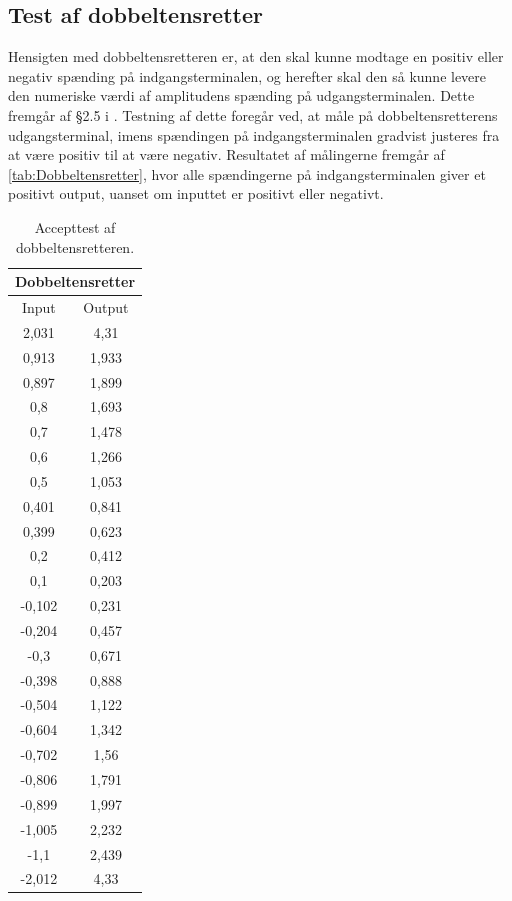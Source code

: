 \subsection{Test af dobbeltensretter}
Hensigten med dobbeltensretteren er, at den skal kunne modtage en positiv eller negativ spænding på indgangsterminalen, og herefter skal den så kunne levere den numeriske værdi af amplitudens spænding på udgangsterminalen. Dette fremgår af §2.5 i . Testning af dette foregår ved, at måle på dobbeltensretterens udgangsterminal, imens spændingen på indgangsterminalen gradvist justeres fra at være positiv til at være negativ. Resultatet af målingerne fremgår af \autoref{tab:Dobbeltensretter}, hvor alle spændingerne på indgangsterminalen giver et positivt output, uanset om inputtet er positivt eller negativt.
%
\begin{table}[H]
\centering
\begin{tabular}{|c|c|}
\hline
\multicolumn{2}{|c|}{Dobbeltensretter} \\ \hline
Input              & Output            \\ \hline
2,031              & 4,31              \\ \hline
0,913              & 1,933             \\ \hline
0,897              & 1,899             \\ \hline
0,8                & 1,693             \\ \hline
0,7                & 1,478             \\ \hline
0,6                & 1,266             \\ \hline
0,5                & 1,053             \\ \hline
0,401              & 0,841             \\ \hline
0,399              & 0,623             \\ \hline
0,2                & 0,412             \\ \hline
0,1                & 0,203             \\ \hline
-0,102             & 0,231             \\ \hline
-0,204             & 0,457             \\ \hline
-0,3               & 0,671             \\ \hline
-0,398             & 0,888             \\ \hline
-0,504             & 1,122             \\ \hline
-0,604             & 1,342             \\ \hline
-0,702             & 1,56              \\ \hline
-0,806             & 1,791             \\ \hline
-0,899             & 1,997             \\ \hline
-1,005             & 2,232             \\ \hline
-1,1               & 2,439             \\ \hline
-2,012             & 4,33              \\ \hline
\end{tabular}
\caption{Accepttest af dobbeltensretteren.}
\label{tab:Dobbeltensretter}
\end{table}
%
